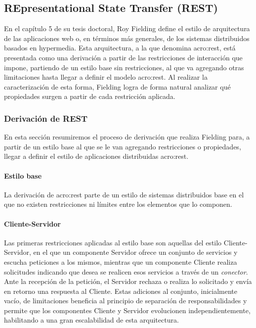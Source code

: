 \subsection{REpresentational State Transfer (REST)}
\label{standard:rest}

En el capítulo 5 de su tesis doctoral, Roy Fielding define el estilo de arquitectura de las aplicaciones web o, en términos más generales, de los sistemas distribuidos basados en hypermedia. Esta arquitectura, a la que denomina \gls{acro:rest}, está presentada como una derivación a partir de las restricciones de interacción que impone, partiendo de un estilo base sin restricciones, al que va agregando otras limitaciones hasta llegar a definir el modelo \gls{acro:rest}. Al realizar la caracterización de esta forma, Fielding logra de forma natural analizar qué propiedades surgen a partir de cada restricción aplicada.


\subsubsection{Derivación de REST}
\label{standard:rest:derivacion}

En esta sección resumiremos el proceso de derivación que realiza Fielding para, a partir de un estilo base al que se le van agregando restricciones o propiedades, llegar a definir el estilo de aplicaciones distribuidas \gls{acro:rest}.

\paragraph{Estilo base}

La derivación de \gls{acro:rest} parte de un estilo de sistemas distribuidos base en el que no existen restricciones ni límites entre los elementos que lo componen.


\paragraph{Cliente-Servidor}

Las primeras restricciones aplicadas al estilo base son aquellas del estilo Cliente-Servidor\cite[Sec.~3.4.1]{tesis:fielding}, en el que un componente Servidor ofrece un conjunto de servicios y escucha peticiones a los mismos, mientras que un componente Cliente realiza solicitudes indicando que desea se realicen esos servicios a través de un \textit{conector}. Ante la recepción de la petición, el Servidor rechaza o realiza lo solicitado y envía en retorno una respuesta al Cliente.
Estas adiciones al conjunto, inicialmente vacío, de limitaciones beneficia al principio de separación de responsabilidades y permite que los componentes Cliente y Servidor evolucionen independientemente, habilitando a una gran escalabilidad de esta arquitectura.


